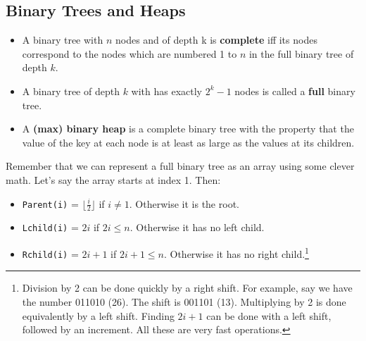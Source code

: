 \documentclass[11pt]{article}
\begin{document}
\subsection{Binary Trees and Heaps}
\begin{tcolorbox}
\begin{itemize}
    \item A binary tree with $n$ nodes and of depth k is \textbf{complete} iff its nodes correspond to the nodes which are numbered 1 to $n$ in the full binary tree of depth $k$. 
    \item A binary tree of depth $k$ with has exactly $2^k-1$ nodes is called a \textbf{full} binary tree.
    \item A \textbf{(max) binary heap} is a complete binary tree with the property that the value of the key at each node is at least as large as the values at its children.
\end{itemize}
\end{tcolorbox}
Remember that we can represent a full binary tree as an array using some clever math. Let's say the array starts at index 1. Then:
\begin{itemize}
    \item \texttt{Parent(i)} = $\lfloor \frac{i}{2} \rfloor$ if $i \neq 1$. Otherwise it is the root.
    \item \texttt{Lchild(i)} = $2i$ if $2i \leq n$. Otherwise it has no left child.
    \item \texttt{Rchild(i)} = $2i+1$ if $2i+1 \leq n$. Otherwise it has no right child.\footnote{Division by 2 can be done quickly by a right shift. For example, say we have the number 011010 (26). The shift is 001101 (13). Multiplying by 2 is done equivalently by a left shift. Finding $2i+1$ can be done with a left shift, followed by an increment. All these are very fast operations.}
\end{itemize}
\end{document}
